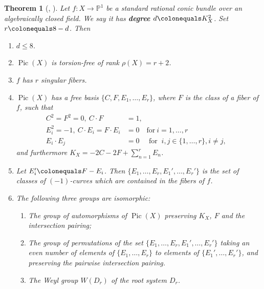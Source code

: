 \documentclass[a4paper, 11pt, reqno]{amsart}
\numberwithin{equation}{section} \numberwithin{figure}{section}
\newcommand{\term}[1]{\textbf{#1}}          %
\DeclareMathOperator{\Pic}{Pic}
\def \P {{\mathbb P}}
\newcommand{\ra}{\rightarrow}
\newtheorem{theorem}[lemma]{Theorem}
\theoremstyle{definition}
\numberwithin{lemma}{section}
\begin{document}
\begin{theorem}[{\cite[Theorem 2.2.1, Theorem 2.2.2]{manintsfasman}, \cite[Proposition 0.3, Proposition 0.4]{KunyavskiiTsfasman}}]\label{thm:MT2.2.2}
    Let $f \colon X \ra \P^1$ be a standard rational conic bundle over an algebraically closed field. We say it has \term{degree} $d \colonequals K_X^2$. Set $r \colonequals 8 - d$. Then
    \begin{enumerate}[label=(\alph*)]
        \item $d \leq 8$.
        
        \item $\Pic(X)$ is torsion-free of rank $\rho(X) = r + 2$.
        \item $f$ has $r$ singular fibers.
        
        \item  $\Pic(X)$ has a free basis $\{C, F, E_1, \ldots, E_r\}$, where $F$ is the class of a fiber of $f$, such that 
    \begin{align*}
        C^2 = F^2 = 0,\ C \cdot F &= 1,&\\
        E_i^2 = -1,\ C \cdot E_i = F \cdot E_i &= 0 \quad \text{for} \ i = 1, \ldots, r\\
        E_i \cdot E_j &= 0 \quad \text{ for }\ i, j \in \{1, \ldots, r\}, i \neq j,
    \end{align*}
    and furthermore $K_X = -2C - 2F + \sum_{n=1}^r E_n$. \label{thm:MT2.2.2(d)}
    
    \item Let $E_i' \colonequals F - E_i$. Then $\{E_1, \ldots, E_r, E_1', \ldots, E_r'\}$ is the set of classes of $(-1)$-curves which are contained in the fibers of $f$.
    
    \item The following three groups are isomorphic:
    \begin{enumerate}[label=(\roman*)]
        \item The group of automorphisms of $\Pic(X)$ preserving $K_X$, $F$ and the intersection pairing;
        \item The group of permutations of the set $\{E_1, \ldots, E_r, E_1', \ldots, E_r'\}$ taking an even number of elements of $\{E_1, \ldots, E_r\}$ to elements of $\{E_1', \ldots, E_r'\}$, and preserving the pairwise intersection pairing.
        \item The Weyl group $W(D_r)$ of the root system $D_r$. 
    \end{enumerate}\label{thm:MT2.2.2(f)}
    \end{enumerate}
\end{theorem}
\end{document}
